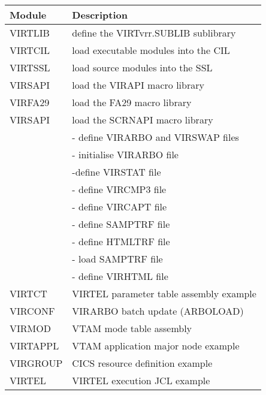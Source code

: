 \documentclass[letterpaper,10pt,english]{sphinxmanual}
\begin{document}
\begin{sphinxVerbatim}[commandchars=\\\{\}]
   
\end{sphinxVerbatim}


\begin{savenotes}\sphinxattablestart
\centering
\begin{tabulary}{\linewidth}[t]{|T|T|}
\hline
\sphinxstyletheadfamily 
Module
&\sphinxstyletheadfamily 
Description
\\
\hline
VIRTLIB
&
define the VIRTvrr.SUBLIB sublibrary
\\
\hline
VIRTCIL
&
load executable modules into the CIL
\\
\hline
VIRTSSL
&
load source modules into the SSL
\\
\hline
VIRSAPI
&
load the VIRAPI macro library
\\
\hline
VIRFA29
&
load the FA29 macro library
\\
\hline
VIRSAPI
&
load the SCRNAPI macro library
\\
\hline{}%
&
 - define VIRARBO and VIRSWAP files
\\
&
 - initialise VIRARBO file
\\
&
 -define VIRSTAT file
\\
&
 - define VIRCMP3 file
\\
&
 - define VIRCAPT file
\\
&
 - define SAMPTRF file
\\
&
 - define HTMLTRF file
\\
&
 - load SAMPTRF file
\\
&
 - define VIRHTML file
\\
\hline
VIRTCT
&
VIRTEL parameter table assembly example
\\
\hline
VIRCONF
&
VIRARBO batch update (ARBOLOAD)
\\
\hline
VIRMOD
&
VTAM mode table assembly
\\
\hline
VIRTAPPL
&
VTAM application major node example
\\
\hline
VIRGROUP
&
CICS resource definition example
\\
\hline
VIRTEL
&
VIRTEL execution JCL example
\\
\hline
\end{tabulary}
\par
\sphinxattableend\end{savenotes}
\end{document}
